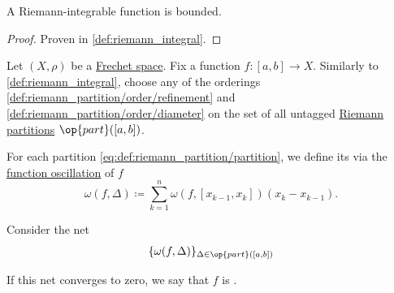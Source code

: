 \begin{corollary}\label{thm:riemann_integrable_implies_bounded}
  A Riemann-integrable function is bounded.
\end{corollary}
\begin{proof}
  Proven in \cref{def:riemann_integral}.
\end{proof}

\begin{definition}\label{def:darboux_integrability}
  Let \( (X, \rho) \) be a \hyperref[def:frechet_space]{Frechet space}. Fix a function \( f: [a, b] \to X \). Similarly to \cref{def:riemann_integral}, choose any of the orderings \cref{def:riemann_partition/order/refinement} and \cref{def:riemann_partition/order/diameter} on the set of all untagged \hyperref[def:riemann_partition/partition]{Riemann partitions} \( \op{part}([a, b]) \).

  For each partition \eqref{eq:def:riemann_partition/partition}, we define its  via the \hyperref[def:function_oscillation]{function oscillation} of \( f \)
  \begin{equation}\label{eq:def:darboux_integrability/oscillation}
    \omega(f, \Delta) \coloneqq \sum_{k=1}^n \omega(f, [x_{k-1}, x_k]) (x_k - x_{k-1}).
  \end{equation}

  Consider the net
  \begin{equation}\label{eq:def:darboux_integrability/net}
    \{ \omega(f, \Delta) \}_{\Delta \in \op{part}([a, b])}
  \end{equation}

  If this net converges to zero, we say that \( f \) is .
\end{definition}

